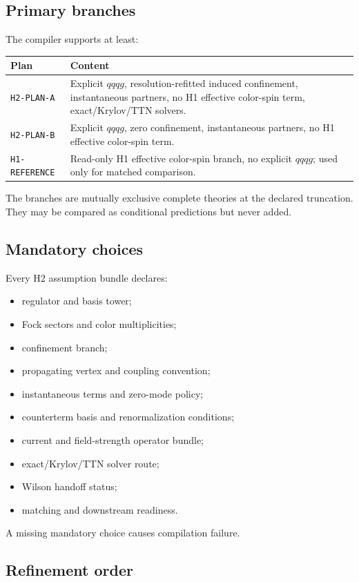 \documentclass[11pt]{article}
\begin{document}
\subsection{Primary branches}

The compiler supports at least:
\begin{longtable}{L{0.18\textwidth}L{0.74\textwidth}}
\toprule
Plan & Content\\
\midrule
\endhead
\texttt{H2-PLAN-A} & Explicit \(qqqg\), resolution-refitted induced confinement,
instantaneous partners, no H1 effective color-spin term, exact/Krylov/TTN
solvers.\\
\texttt{H2-PLAN-B} & Explicit \(qqqg\), zero confinement, instantaneous
partners, no H1 effective color-spin term.\\
\texttt{H1-REFERENCE} & Read-only H1 effective color-spin branch, no explicit
\(qqqg\); used only for matched comparison.\\
\bottomrule
\end{longtable}
The branches are mutually exclusive complete theories at the declared
truncation.  They may be compared as conditional predictions but never added.

\subsection{Mandatory choices}

Every H2 assumption bundle declares:
\begin{itemize}
 \item regulator and basis tower;
 \item Fock sectors and color multiplicities;
 \item confinement branch;
 \item propagating vertex and coupling convention;
 \item instantaneous terms and zero-mode policy;
 \item counterterm basis and renormalization conditions;
 \item current and field-strength operator bundle;
 \item exact/Krylov/TTN solver route;
 \item Wilson handoff status;
 \item matching and downstream readiness.
\end{itemize}
A missing mandatory choice causes compilation failure.

\subsection{Refinement order}
\end{document}
